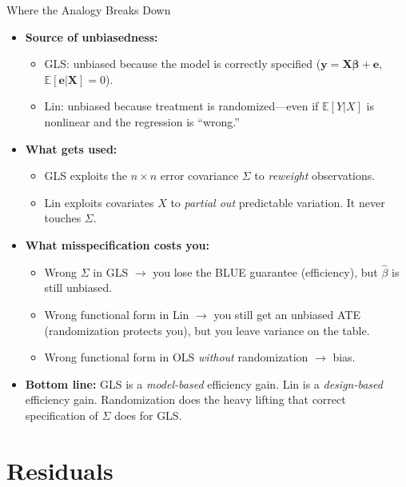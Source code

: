 \documentclass[aspectratio=169, handout]{beamer}
\numberwithin{equation}{section}
\begin{document}
\begin{frame}{Where the Analogy Breaks Down}
\begin{itemize}
\item \textbf{Source of unbiasedness:}\pause
\begin{itemize}
\item GLS: unbiased because the \alert{model is correctly specified} ($\bm{y}=\bm{X\beta}+\bm{e}$, $\mathbb{E}[\bm{e}|\bm{X}]=0$).
\item Lin: unbiased because \alert{treatment is randomized}---even if $\mathbb{E}[Y|X]$ is nonlinear and the regression is ``wrong.''
\end{itemize}\pause
\item \textbf{What gets used:}\pause
\begin{itemize}
\item GLS exploits the $n\times n$ error covariance $\Sigma$ to \emph{reweight} observations.
\item Lin exploits covariates $X$ to \emph{partial out} predictable variation.  It never touches $\Sigma$.
\end{itemize}\pause
\item \textbf{What misspecification costs you:}\pause
\begin{itemize}
\item Wrong $\Sigma$ in GLS $\to$ you lose the BLUE guarantee (efficiency), but $\hat{\beta}$ is still unbiased.
\item Wrong functional form in Lin $\to$ you still get an unbiased ATE (randomization protects you), but you leave variance on the table.
\item Wrong functional form in OLS \emph{without} randomization $\to$ bias.
\end{itemize}\pause
\item \textbf{Bottom line:} GLS is a \emph{model-based} efficiency gain.  Lin is a \emph{design-based} efficiency gain.  Randomization does the heavy lifting that correct specification of $\Sigma$ does for GLS.
\end{itemize}
\end{frame}


\section{Residuals}
\end{document}
